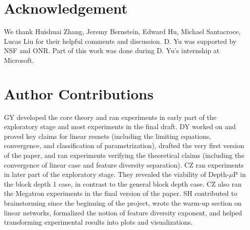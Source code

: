 \section*{Acknowledgement}
We thank Huishuai Zhang, Jeremy Bernstein, Edward Hu, Michael Santacroce, Lucas Liu for their helpful comments and discussion. 
D. Yu was supported by NSF and ONR. Part of this work was done during D. Yu's internship at Microsoft. 

\section*{Author Contributions}

GY developed the core theory and ran experiments in early part of the exploratory stage and most experiments in the final draft.
DY worked on and proved key claims for linear resnets (including the limiting equations, convergence, and classification of parametrization), drafted the very first version of the paper, and ran experiments verifying the theoretical claims (including the convergence of linear case and feature diversity separation).
CZ ran experiments in later part of the exploratory stage. They revealed the viability of Depth-$\mu$P in the block depth 1 case, in contrast to the general block depth case.
CZ also ran the Megatron experiments in the final version of the paper.
SH contributed to brainstorming since the beginning of the project, wrote the warm-up section on linear networks, formalized the notion of feature diversity exponent, and helped transforming experimental results into plots and visualizations.
